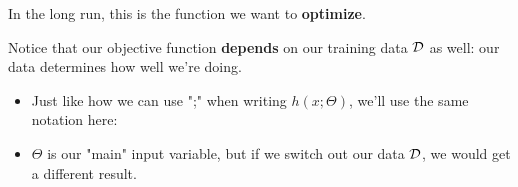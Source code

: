         
        In the long run, this is the function we want to \textbf{optimize}.
        
        Notice that our objective function \textbf{depends} on our training data ${\cal D}$ as well: our data determines how well we're doing.

        \begin{itemize}
            \item Just like how we can use ";" when writing $h(x;\Theta)$, we'll use the same notation here: 
            
            \item $\Theta$ is our "main" input variable, but if we switch out our data ${\cal D}$, we would get a different result.\\
        \end{itemize}
        
        
        
        
        
